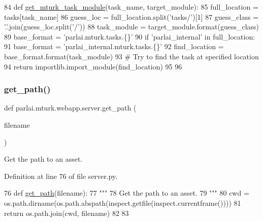 \begin{DoxyCode}
84 \textcolor{keyword}{def }\hyperlink{namespaceparlai_1_1mturk_1_1webapp_1_1server_a0c7e088cb9401f94297c2ae96dce3ec2}{get\_mturk\_task\_module}(task\_name, target\_module):
85     full\_location = tasks[task\_name]
86     guess\_loc = full\_location.split(\textcolor{stringliteral}{'tasks/'})[1]
87     guess\_class = \textcolor{stringliteral}{'.'}.join(guess\_loc.split(\textcolor{stringliteral}{'/'}))
88     task\_module = target\_module.format(guess\_class)
89     base\_format = \textcolor{stringliteral}{'parlai.mturk.tasks.\{\}'}
90     \textcolor{keywordflow}{if} \textcolor{stringliteral}{'parlai\_internal'} \textcolor{keywordflow}{in} full\_location:
91         base\_format = \textcolor{stringliteral}{'parlai\_internal.mturk.tasks.\{\}'}
92     find\_location = base\_format.format(task\_module)
93     \textcolor{comment}{# Try to find the task at specified location}
94     \textcolor{keywordflow}{return} importlib.import\_module(find\_location)
95 
96 
\end{DoxyCode}
\mbox{\label{namespaceparlai_1_1mturk_1_1webapp_1_1server_abf5dde99069f271f98bd20e7fb7cdccd}} 
\subsubsection{\texorpdfstring{get\+\_\+path()}{get\_path()}}
{\footnotesize\ttfamily def parlai.\+mturk.\+webapp.\+server.\+get\+\_\+path (\begin{DoxyParamCaption}\item[{}]{filename }\end{DoxyParamCaption})}

\begin{DoxyVerb}Get the path to an asset.
\end{DoxyVerb}
 

Definition at line 76 of file server.\+py.


\begin{DoxyCode}
76 \textcolor{keyword}{def }\hyperlink{namespaceparlai_1_1mturk_1_1webapp_1_1server_abf5dde99069f271f98bd20e7fb7cdccd}{get\_path}(filename):
77     \textcolor{stringliteral}{"""}
78 \textcolor{stringliteral}{    Get the path to an asset.}
79 \textcolor{stringliteral}{    """}
80     cwd = os.path.dirname(os.path.abspath(inspect.getfile(inspect.currentframe())))
81     \textcolor{keywordflow}{return} os.path.join(cwd, filename)
82 
83 
\end{DoxyCode}
\mbox{\label{namespaceparlai_1_1mturk_1_1webapp_1_1server_a762795ce59d6dbcb111fd9162a870f9f}} 
